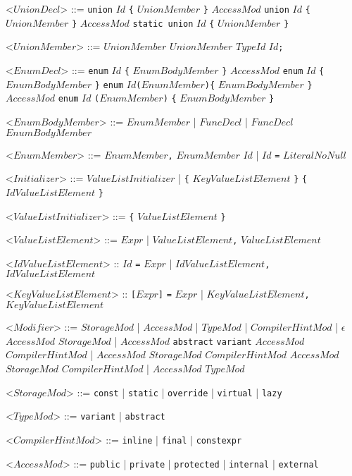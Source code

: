 \documentclass{article}
\newcommand{\gtext}[1]{<$#1$>}
\newcommand{\glit}[1]{\texttt{#1}}
\begin{document}
\begin{grammar}
	\gtext{UnionDecl} ::= \glit{union} $Id$ \glit{\{} $UnionMember$ \glit{\}}
	\alt $AccessMod$ \glit{union} $Id$ \glit{\{} $UnionMember$ \glit{\}}
	\alt $AccessMod$ \glit{static union} $Id$ \glit{\{} $UnionMember$ \glit{\}}
	
	\gtext{UnionMember} ::= $UnionMember$ $UnionMember$
	\alt $TypeId$ $Id$\glit{;}	
	
	\gtext{EnumDecl} ::= \glit{enum} $Id$ \glit{\{} $EnumBodyMember$ \glit{\}}
	\alt $AccessMod$ \glit{enum} $Id$ \glit{\{} $EnumBodyMember$ \glit{\}}
	\alt \glit{enum} $Id$\glit{(}$EnumMember$\glit{)\{} $EnumBodyMember$ \glit{\}}
	\alt $AccessMod$ \glit{enum} $Id$ \glit{(}$EnumMember$\glit{)} \glit{\{} $EnumBodyMember$ \glit{\}}
	
	\gtext{EnumBodyMember} ::= $EnumMember$ | $FuncDecl$ | $FuncDecl$ $EnumBodyMember$
	
	\gtext{EnumMember} ::=  $EnumMember$\glit{,} $EnumMember$
	\alt $Id$ | $Id$ \glit{=} $LiteralNoNull$
	
	\newpage
	
	\gtext{Initializer} ::= $ValueListInitializer$ | \glit{\{} $KeyValueListElement$ \glit{\}}
	\alt \glit{\{} $IdValueListElement$ \glit{\}}
	
	\gtext{ValueListInitializer} ::= \glit{\{} $ValueListElement$ \glit{\}}
	
	\gtext{ValueListElement} ::= $Expr$ | $ValueListElement$\glit{,} $ValueListElement$
	
	\gtext{IdValueListElement} :: $Id$ \glit{=} $Expr$ | $IdValueListElement$\glit{,} $IdValueListElement$
	
\gtext{KeyValueListElement} :: \glit{[}$Expr$\glit{]} \glit{=} $Expr$ | $KeyValueListElement$\glit{,} $KeyValueListElement$	
	
	\gtext{Modifier} ::= $StorageMod$ | $AccessMod$ | $TypeMod$ | $CompilerHintMod$ | $\epsilon$
	\alt $AccessMod$ $StorageMod$ | $AccessMod$ \glit{abstract} \glit{variant}
	\alt $AccessMod$ $CompilerHintMod$ | $AccessMod$ $StorageMod$ $CompilerHintMod$
	\alt $AccessMod$ $StorageMod$ $CompilerHintMod$ | $AccessMod$ $TypeMod$
	
	\gtext{StorageMod} ::= \glit{const} | \glit{static} | \glit{override} | \glit{virtual} | \glit{lazy}
	
	\gtext{TypeMod} ::= \glit{variant} | \glit{abstract}
	
	\gtext{CompilerHintMod} ::= \glit{inline} | \glit{final} | \glit{constexpr}
	
	\gtext{AccessMod} ::= \glit{public} | \glit{private} | \glit{protected} | \glit{internal} | \glit{external}
	

\end{grammar}
\end{document}
